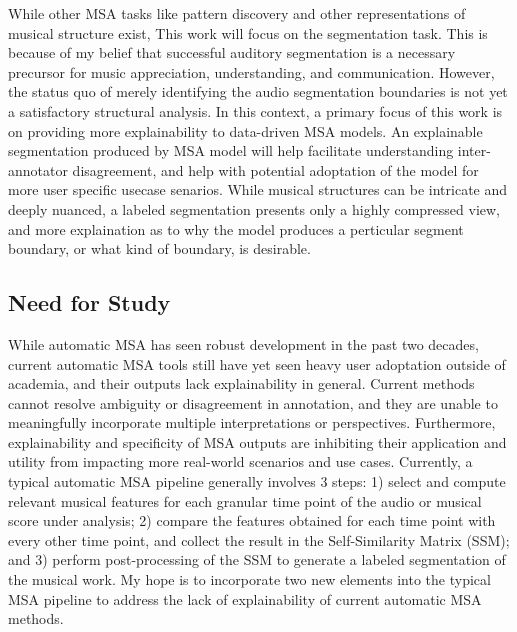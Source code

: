 While other MSA tasks like pattern discovery and other representations of musical structure exist, This work will focus on the segmentation task.
This is because of my belief that successful auditory segmentation is a necessary precursor for music appreciation, understanding, and communication. 
However, the status quo of merely identifying the audio segmentation boundaries is not yet a satisfactory structural analysis.
In this context, a primary focus of this work is on providing more explainability to data-driven MSA models.
An explainable segmentation produced by MSA model will help facilitate understanding inter-annotator disagreement, and help with potential adoptation of the model for more user specific usecase senarios.
While musical structures can be intricate and deeply nuanced, a labeled segmentation presents only a highly compressed view, and more explaination as to why the model produces a perticular segment boundary, or what kind of boundary, is desirable.

\subsection{Need for Study}
While automatic MSA has seen robust development in the past two decades, current automatic MSA tools still have yet seen heavy user adoptation outside of academia, and their outputs lack explainability in general. 
Current methods cannot resolve ambiguity or disagreement in annotation, and they are unable to meaningfully incorporate multiple interpretations or perspectives. 
Furthermore, explainability and specificity of MSA outputs are inhibiting their application and utility from impacting more real-world scenarios and use cases.
Currently, a typical automatic MSA pipeline generally involves 3 steps: 1) select and compute relevant musical features for each granular time point of the audio or musical score under analysis; 2) compare the features obtained for each time point with every other time point, and collect the result in the Self-Similarity Matrix (SSM); and 3) perform post-processing of the SSM to generate a labeled segmentation of the musical work.
My hope is to incorporate two new elements into the typical MSA pipeline to address the lack of explainability of current automatic MSA methods.

